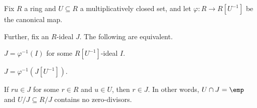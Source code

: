 \documentclass[../notes.tex]{subfiles}
\begin{document}
\begin{lemma} \label{lem:localidealsb}
	Fix $R$ a ring and $U\subseteq R$ a multiplicatively closed set, and let $\varphi:R\to R\left[U^{-1}\right]$ be the canonical map.
	
	Further, fix an $R$-ideal $J$. The following are equivalent.
	\begin{listroman}
		\item $J=\varphi^{-1}(I)$ for some $R\left[U^{-1}\right]$-ideal $I$.
		\item $J=\varphi^{-1}\left(J\left[U^{-1}\right]\right)$.
		\item If $ru\in J$ for some $r\in R$ and $u\in U$, then $r\in J$. In other words, $U\cap J=\emp$ and $U/J\subseteq R/J$ contains no zero-divisors.
	\end{listroman}
\end{lemma}
\end{document}
